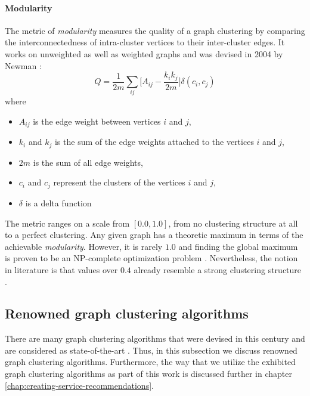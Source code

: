 \documentclass[12pt,a4paper]{report}
\begin{document}
\paragraph{Modularity}
The metric of \textit{modularity} measures the quality of a graph clustering
by comparing the interconnectedness of intra-cluster vertices to their
inter-cluster edges. It works on unweighted as well as weighted graphs
\cite{clauset2004modularity, blondel2008modularity}
and was devised in 2004 by Newman \cite{newman2004fast}:
\[
  Q =
  \frac{1}{2m}
  \sum \limits _{ij}{\bigg[ A_{ij} - \frac{k_i k_j}{2m} \bigg]}
  \delta (c_i, c_j)
\]
where
\begin{itemize}[noitemsep]
  \item \(A_{ij}\) is the edge weight between vertices \(i\) and \(j\),
  \item \(k_i\) and \(k_j\) is the sum of the edge weights attached to
        the vertices \(i\) and \(j\),
  \item \(2m\) is the sum of all edge weights,
  \item \(c_i\) and \(c_j\) represent the clusters of the vertices \(i\) and \(j\),
  \item \(\delta\) is a delta function
\end{itemize}
The metric ranges on a scale from \([0.0, 1.0]\), from no clustering structure
at all to a perfect clustering. Any given graph has a theoretic maximum in terms
of the achievable \textit{modularity}. However, it is rarely \(1.0\) and finding
the global maximum is proven to be an NP-complete optimization problem
\cite{brandes2006maximizing}. Nevertheless, the notion in literature is that
values over \(0.4\) already resemble a strong clustering structure
\cite{newman2004fast, fortunato2007resolution}.


\subsection{Renowned graph clustering algorithms} \label{subsect:renowned-graph-clustering-algorithms}

There are many graph clustering algorithms that were devised in this century
and are considered as state-of-the-art
\cite{lancichinetti2009community, fortunato2010community, danon2005comparing}.
Thus, in this subsection we discuss renowned graph clustering algorithms.
Furthermore, the way that we utilize the exhibited graph clustering algorithms
as part of this work is discussed further in chapter
\ref{chap:creating-service-recommendations}.
\end{document}
